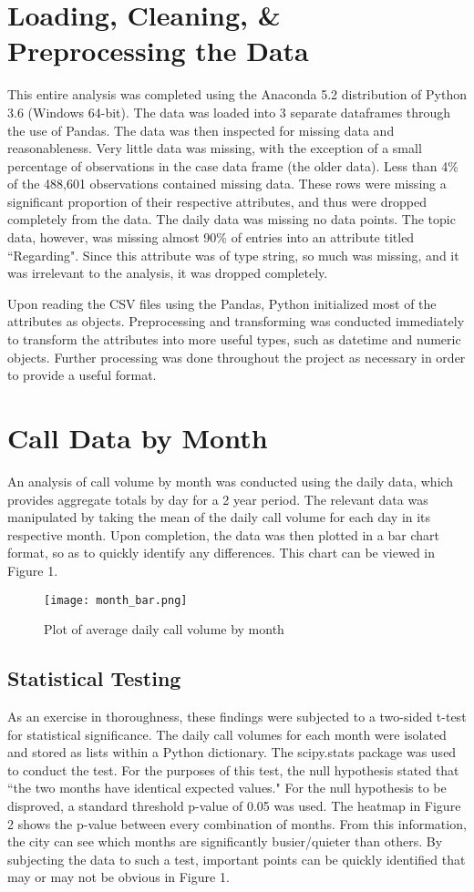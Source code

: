 \documentclass[11pt,twocolumn]{article}
\begin{document}
\section{Loading, Cleaning, \& Preprocessing the Data}
This entire analysis was completed using the Anaconda 5.2 distribution of Python 3.6 (Windows 64-bit).  The data was loaded into 3 separate dataframes through the use of Pandas.  The data was then inspected for missing data and reasonableness.  Very little data was missing, with the exception of a small percentage of observations in the case data frame (the older data).  Less than 4\% of the 488,601 observations contained missing data.  These rows were missing a significant proportion of their respective attributes, and thus were dropped completely from the data.  The daily data was missing no data points.  The topic data, however, was missing almost 90\% of entries into an attribute titled ``Regarding".  Since this attribute was of type string, so much was missing, and it was irrelevant to the analysis, it was dropped completely.
\par
Upon reading the CSV files using the Pandas, Python initialized most of the attributes as objects.  Preprocessing and transforming was conducted immediately to transform the attributes into more useful types, such as datetime and numeric objects.  Further processing was done throughout the project as necessary in order to provide a useful format.

\section{Call Data by Month}
An analysis of call volume by month was conducted using the daily data, which provides aggregate totals by day for a 2 year period. The relevant data was manipulated by taking the mean of the daily call volume for each day in its respective month.  Upon completion, the data was then plotted in a bar chart format, so as to quickly identify any differences.  This chart can be viewed in Figure 1.

\begin{figure}[h]
  \texttt{[image: month\_bar.png]}
  \caption{Plot of average daily call volume by month}
\end{figure}

\subsection{Statistical Testing}
As an exercise in thoroughness, these findings were subjected to a two-sided t-test for statistical significance.  The daily call volumes for each month were isolated and stored as lists within a Python dictionary.  The scipy.stats package was used to conduct the test.  For the purposes of this test, the null hypothesis stated that ``the two months have identical expected values."  For the null hypothesis to be disproved, a standard threshold p-value of 0.05 was used.  The heatmap in Figure 2 shows the p-value between every combination of months.  From this information, the city can see which months are significantly busier/quieter than others.  By subjecting the data to such a test, important points can be quickly identified that may or may not be obvious in Figure 1.
\end{document}
